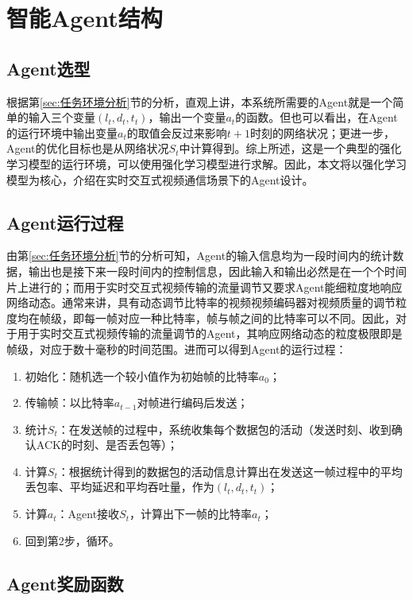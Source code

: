 \documentclass[a4paper]{ctexart}
\begin{document}
\section{智能Agent结构}

\subsection{Agent选型}

根据第\ref{sec:任务环境分析}节的分析，直观上讲，本系统所需要的Agent就是一个简单的输入三个变量$(l_t, d_t, t_t)$，输出一个变量$a_t$的函数。但也可以看出，在Agent的运行环境中输出变量$a_t$的取值会反过来影响$t+1$时刻的网络状况；更进一步，Agent的优化目标也是从网络状况$S_t$中计算得到。综上所述，这是一个典型的强化学习模型的运行环境，可以使用强化学习模型进行求解。因此，本文将以强化学习模型为核心，介绍在实时交互式视频通信场景下的Agent设计。

\subsection{Agent运行过程}

由第\ref{sec:任务环境分析}节的分析可知，Agent的输入信息均为一段时间内的统计数据，输出也是接下来一段时间内的控制信息，因此输入和输出必然是在一个个时间片上进行的；而用于实时交互式视频传输的流量调节又要求Agent能细粒度地响应网络动态。通常来讲，具有动态调节比特率的视频视频编码器对视频质量的调节粒度均在帧级，即每一帧对应一种比特率，帧与帧之间的比特率可以不同。因此，对于用于实时交互式视频传输的流量调节的Agent，其响应网络动态的粒度极限即是帧级，对应于数十毫秒的时间范围。进而可以得到Agent的运行过程：

\begin{enumerate}[label=\arabic*、]
	\item 初始化：随机选一个较小值作为初始帧的比特率$a_0$；
	\item 传输帧：以比特率$a_{t-1}$对帧进行编码后发送；
	\item 统计$S_t$：在发送帧的过程中，系统收集每个数据包的活动（发送时刻、收到确认ACK的时刻、是否丢包等）；
	\item 计算$S_t$：根据统计得到的数据包的活动信息计算出在发送这一帧过程中的平均丢包率、平均延迟和平均吞吐量，作为$(l_t, d_t, t_t)$；
	\item 计算$a_t$：Agent接收$S_t$，计算出下一帧的比特率$a_t$；
	\item 回到第2步，循环。
\end{enumerate}

\subsection{Agent奖励函数}
\end{document}
